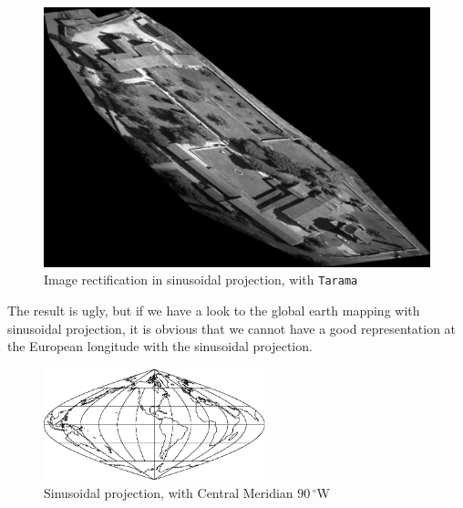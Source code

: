 \begin{figure}[H]
\begin{center}
\includegraphics[width=150mm]{FIGS/Cuxa/Sinus-Ortho-Eg-Test-Redr.jpg}
\caption{Image rectification in sinusoidal projection, with {\tt Tarama}}
\end{center}
\end{figure}


The result is ugly, but if we have a look to the global earth mapping with sinusoidal projection, it is obvious that we cannot have a good representation at the European longitude with the sinusoidal projection.

\begin{figure}[H]
\begin{center}
\includegraphics[width=182pt]{FIGS/Cuxa/Sinus90.jpg}
\caption{Sinusoidal projection, with Central Meridian $90\,^{\circ}$W}
\end{center}
\end{figure}

